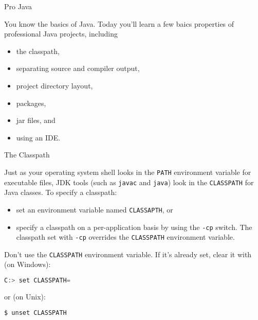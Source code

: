 \documentclass{beamer}
\author[Chris Simpkins]
{Christopher Simpkins \\\texttt{chris.simpkins@gatech.edu}}
\institute[Georgia Tech] %
\date[CS 1331]{}
\begin{document}
\begin{frame}
  \titlepage
\end{frame}

\begin{frame}[fragile]{Pro Java}


You know the basics of Java.  Today you'll learn a few baics properties of professional Java projects, including
\begin{itemize}
\item the classpath,
\item separating source and compiler output,
\item project directory layout,
\item packages,
\item jar files, and
\item using an IDE.
\end{itemize}

\end{frame}

\begin{frame}[fragile]{The Classpath}


Just as your operating system shell looks in the {\tt PATH} environment variable for executable files, JDK tools (such as {\tt javac} and {\tt java}) look in the {\tt CLASSPATH} for Java classes. To specify a classpath:

\begin{itemize}
\item set an environment variable named {\tt CLASSAPTH}, or
\item specify a classpath on a per-application basis by using the {\tt -cp} switch.  The classpath set with {\tt -cp} overrides the {\tt CLASSPATH} environment variable.
\end{itemize}
Don't use the {\tt CLASSPATH} environment variable.  If it's already set, clear it with (on Windows):
\begin{lstlisting}[language=Java]
C:> set CLASSPATH=
\end{lstlisting}
or (on Unix):
\begin{lstlisting}[language=Java]
$ unset CLASSPATH
\end{lstlisting}

\end{frame}
\end{document}
